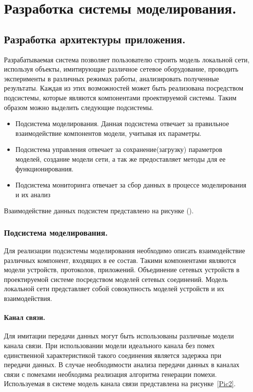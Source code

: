 \documentclass[12pt]{report}
\begin{document}
\chapter{Разработка системы моделирования.}
    \section{Разработка архитектуры приложения. }
    Разрабатываемая система позволяет пользователю строить  модель локальной сети, используя объекты, имитирующие различное сетевое оборудование, проводить эксперименты в различных режимах работы, анализировать полученные результаты. Каждая из этих возможностей может быть реализована посредством подсистемы, которые являются компонентами проектируемой системы. Таким образом можно выделить следующие подсистемы.

    \begin{itemize}
        \item Подсистема моделирования. Данная подсистема отвечает за правильное взаимодействие компонентов модели, учитывая их параметры.
        \item Подсистема управления отвечает за сохранение(загрузку) параметров моделей, создание модели сети, а так же предоставляет методы для ее функционирования.
        \item Подсистема мониторинга отвечает за сбор данных в процессе моделирования и их анализ
    \end{itemize}

    Взаимодействие данных подсистем представлено на рисунке ().

    \subsection{Подсистема моделирования. }

    Для реализации подсистемы моделирования необходимо описать взаимодействие различных компонент, входящих в ее состав. Такими компонентами являются модели устройств, протоколов, приложений. Объединение сетевых устройств в проектируемой системе посредством моделей сетевых соединений. Модель локальной сети представляет собой совокупность моделей устройств и их взаимодействия.

    \subsubsection{Канал связи. }

    Для имитации передачи данных могут быть использованы различные модели канала связи. При использовании модели идеального канала без помех единственной характеристикой такого соединения является задержка при передачи данных. В случае необходимости анализа передачи данных в каналах связи с помехами необходима реализация алгоритма генерации помехи. Используемая в системе модель канала связи представлена на рисунке~\ref{Pic2}.
\end{document}
